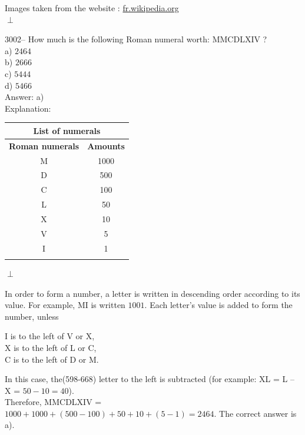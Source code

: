 \documentclass[letterpaper, 12pt]{article}
\begin{document}
Images taken from the website : \href{http://fr.wikipedia.org}{fr.wikipedia.org}\\

\og$\perp$\fg \

3002-- How much is the following Roman numeral worth: MMCDLXIV ?\\

a) $2464$\\
b) $2666$\\
c) $5444$\\
d) $5466$\\

Answer: a)\\

Explanation:\\
\begin{center}
\begin{tabular}{|c|c|}
\multicolumn{2}{c}{\bf List of numerals}\\[2mm] \hline
{\bf Roman numerals} & {\bf Amounts} \\[1mm] \hline \hline
M & 1000 \\[1mm] \hline
D & 500 \\[1mm] \hline
C & 100 \\[1mm] \hline
L & 50 \\[1mm] \hline
X & 10 \\[1mm] \hline
V & 5 \\[1mm] \hline
I & 1 \\[1mm] \hline
\multicolumn{2}{c}{}\\
\end{tabular}\og$\perp$\fg \
\end{center}
In order to form a number, a letter is written in descending order according to its value. For example, MI is written $1001$.  Each letter's value is added to form the number, unless
\begin{center}
I is to the left of V or X,\\
X is to the left of L or C,\\
C is to the left of D or M.\\
\end{center}
In this case, the{\small(598-668)} letter to the left is subtracted (for example: XL = L -- X = $50 - 10 = 40$).\\

Therefore, MMCDLXIV = $1000 + 1000 + (500 - 100) + 50 + 10 + (5 - 1) = 2464$. The correct answer is a).\\
\end{document}
